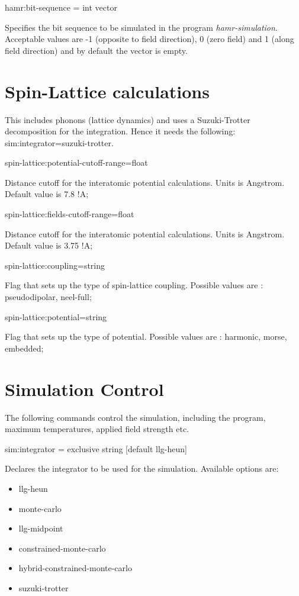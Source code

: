 {\zicf hamr:bit-sequence = int vector}
Specifies the bit sequence to be simulated in the program \textit{hamr-simulation}. 
Acceptable values are -1 (opposite to field direction), 0 (zero field) and 1 (along field direction) and by default the vector is empty.

\section*{Spin-Lattice calculations}
This includes phonons (lattice dynamics) and uses a Suzuki-Trotter decomposition for the integration. Hence it needs the following:
sim:integrator=suzuki-trotter. 

{\zicf spin-lattice:potential-cutoff-range=float}
Distance cutoff for the interatomic potential calculations. Units is Angstrom.  Default value is 7.8 !A;  

{\zicf spin-lattice:fields-cutoff-range=float}
Distance cutoff for the interatomic potential calculations. Units is Angstrom.  Default value is 3.75 !A;  

{\zicf spin-lattice:coupling=string}
 Flag that sets up the type of spin-lattice coupling. Possible values are : pseudodipolar, {neel-full};
 
 {\zicf spin-lattice:potential=string}
 Flag that sets up the type of potential. Possible values are : harmonic, morse, embedded;



\section*{Simulation Control}
The following commands control the simulation, including the program, maximum temperatures, applied field strength etc.

{\zicf sim:integrator = exclusive string [default llg-heun]} Declares the integrator to be used for the simulation. Available options are:
\begin{itemize}
  \item[] llg-heun
  \item[] monte-carlo
  \item[] llg-midpoint
  \item[] constrained-monte-carlo
  \item[] hybrid-constrained-monte-carlo
  \item[] suzuki-trotter
\end{itemize}

